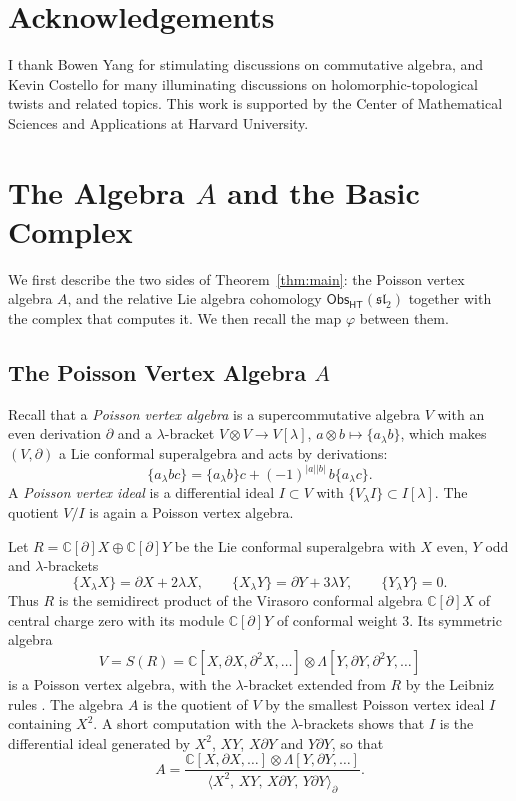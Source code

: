 \documentclass[11pt]{amsart}
\numberwithin{equation}{section}
\theoremstyle{definition}
\theoremstyle{remark}
\newcommand{\C}{\mathbb{C}}
\newcommand{\sltwo}{\mathfrak{sl}_2}
\newcommand{\dd}{\partial}
\newcommand{\Obs}{\mathsf{Obs}_{\mathsf{HT}}}
\begin{document}
\section*{Acknowledgements}
I thank Bowen Yang for stimulating discussions on commutative algebra, and Kevin Costello for many illuminating discussions on holomorphic-topological twists and related topics. This work is supported by the Center of Mathematical Sciences and Applications at Harvard University.

\section{The Algebra \texorpdfstring{$A$}{A} and the Basic Complex}\label{sec:setup}

We first describe the two sides of Theorem~\ref{thm:main}: the Poisson vertex algebra $A$, and the relative Lie algebra cohomology $\Obs(\sltwo)$ together with the complex that computes it. We then recall the map $\varphi$ between them.

\subsection{The Poisson Vertex Algebra \texorpdfstring{$A$}{A}}\label{subsec:A}
Recall that a \emph{Poisson vertex algebra} \cite{BDK09} is a supercommutative algebra $V$ with an even derivation $\dd$ and a $\lambda$-bracket $V\otimes V\to V[\lambda]$, $a\otimes b\mapsto\{a_\lambda b\}$, which makes $(V,\dd)$ a Lie conformal superalgebra \cite{Kac98} and acts by derivations:
\begin{equation}\label{eq:leibniz}
\{a_\lambda bc\}=\{a_\lambda b\}c+(-1)^{|a||b|}\,b\{a_\lambda c\}.
\end{equation}
A \emph{Poisson vertex ideal} is a differential ideal $I\subset V$ with $\{V_\lambda I\}\subset I[\lambda]$. The quotient $V/I$ is again a Poisson vertex algebra.

Let $R=\C[\dd]X\oplus\C[\dd]Y$ be the Lie conformal superalgebra with $X$ even, $Y$ odd and $\lambda$-brackets
\begin{equation}\label{eq:R-brackets}
\{X_\lambda X\}=\dd X+2\lambda X,\qquad
\{X_\lambda Y\}=\dd Y+3\lambda Y,\qquad
\{Y_\lambda Y\}=0 .
\end{equation}
Thus $R$ is the semidirect product of the Virasoro conformal algebra $\C[\dd]X$ of central charge zero with its module $\C[\dd]Y$ of conformal weight $3$. Its symmetric algebra
\begin{equation}\label{eq:V}
V=S(R)=\C[X,\dd X,\dd^2X,\ldots]\otimes\Lambda[Y,\dd Y,\dd^2Y,\ldots]
\end{equation}
is a Poisson vertex algebra, with the $\lambda$-bracket extended from $R$ by the Leibniz rules \cite{BDK09}. The algebra $A$ is the quotient of $V$ by the smallest Poisson vertex ideal $I$ containing $X^2$. A short computation with the $\lambda$-brackets shows that $I$ is the differential ideal generated by $X^2$, $XY$, $X\dd Y$ and $Y\dd Y$, so that
\begin{equation}\label{eq:A-presentation}
A=\frac{\C[X,\dd X,\ldots]\otimes\Lambda[Y,\dd Y,\ldots]}{\langle X^2,\,XY,\,X\dd Y,\,Y\dd Y\rangle_\dd}.
\end{equation}
\end{document}

